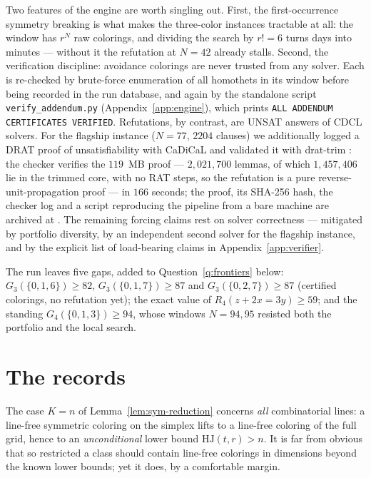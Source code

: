 \documentclass[12pt]{article}
\newcommand{\HJ}{\mathrm{HJ}}
\begin{document}
Two features of the engine are worth singling out. First, the
first-occurrence symmetry breaking is what makes the three-color
instances tractable at all: the window has $r^{N}$ raw colorings, and
dividing the search by $r!=6$ turns days into minutes --- without it
the refutation at $N=42$ already stalls. Second, the verification
discipline: avoidance colorings are never trusted from any solver.
Each is re-checked by brute-force enumeration of all homothets in its
window before being recorded in the run database, and again by the
standalone script \texttt{verify\_addendum.py}
(Appendix~\ref{app:engine}), which prints \texttt{ALL ADDENDUM
CERTIFICATES VERIFIED}. Refutations, by contrast, are UNSAT answers
of CDCL solvers. For the flagship instance ($N=77$, $2204$ clauses) we
additionally logged a DRAT proof of unsatisfiability with CaDiCaL and
validated it with drat-trim
\cite{WetzlerHeuleHunt2014,HeuleKullmann2017}: the checker verifies
the $119$~MB proof --- $2{,}021{,}700$ lemmas, of which $1{,}457{,}406$
lie in the trimmed core, with no RAT steps, so the refutation is a pure
reverse-unit-propagation proof --- in $166$ seconds; the proof, its
SHA-256 hash, the checker log and a script reproducing the pipeline
from a bare machine are archived at \cite{hjcerts}. The remaining
forcing claims rest on solver correctness --- mitigated by portfolio
diversity, by an independent second solver for the flagship instance,
and by the explicit list of load-bearing claims in
Appendix~\ref{app:verifier}.

\begin{remark}\label{rem:sat-open}
The run leaves five gaps, added to Question~\ref{q:frontiers} below:
$G_{3}(\{0,1,6\})\ge 82$, $G_{3}(\{0,1,7\})\ge 87$ and
$G_{3}(\{0,2,7\})\ge 87$ (certified colorings, no refutation yet);
the exact value of $R_{4}(z+2x=3y)\ge 59$; and the standing
$G_{4}(\{0,1,3\})\ge 94$, whose windows $N=94,95$ resisted both the
portfolio and the local search.
\end{remark}

\section{The records}\label{sec:records}

The case $K=n$ of Lemma~\ref{lem:sym-reduction} concerns \emph{all}
combinatorial lines: a line-free symmetric coloring on the simplex lifts
to a line-free coloring of the full grid, hence to an
\emph{unconditional} lower bound $\HJ(t,r)>n$. It is far from obvious
that so restricted a class should contain line-free colorings in
dimensions beyond the known lower bounds; yet it does, by a comfortable
margin.
\end{document}
